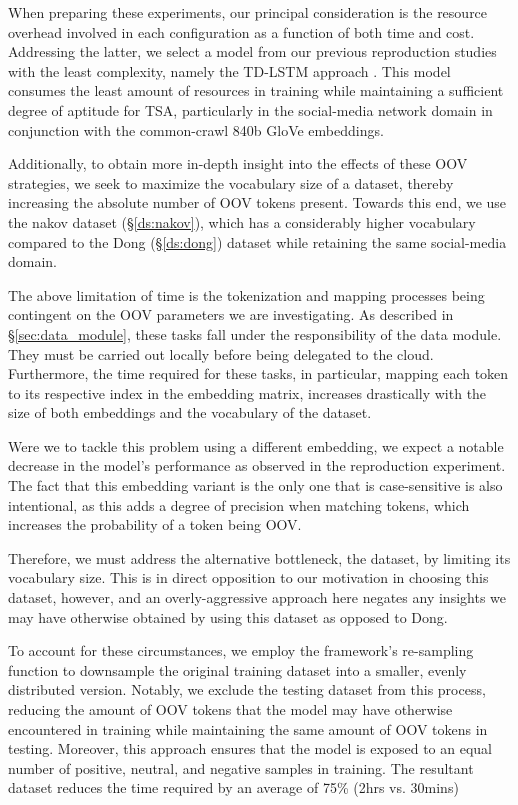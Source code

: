 \documentclass[../../fyp.tex]{subfiles}
\begin{document}
When preparing these experiments, our principal consideration is the resource overhead involved in each configuration as a function of both time and cost. Addressing the latter, we select a model from our previous reproduction studies with the least complexity, namely the TD-LSTM approach \citep{tang2016b}. This model consumes the least amount of resources in training while maintaining a sufficient degree of aptitude for TSA, particularly in the social-media network domain in conjunction with the common-crawl 840b GloVe embeddings. 

Additionally, to obtain more in-depth insight into the effects of these OOV strategies, we seek to maximize the vocabulary size of a dataset, thereby increasing the absolute number of OOV tokens present. Towards this end, we use the nakov dataset (\S\ref{ds:nakov}), which has a considerably higher vocabulary compared to the Dong (\S\ref{ds:dong}) dataset while retaining the same social-media domain.

The above limitation of time is the tokenization and mapping processes being contingent on the OOV parameters we are investigating. As described in \S\ref{sec:data_module}, these tasks fall under the responsibility of the data module. They must be carried out locally before being delegated to the cloud. Furthermore, the time required for these tasks, in particular, mapping each token to its respective index in the embedding matrix, increases drastically with the size of both embeddings and the vocabulary of the dataset.

Were we to tackle this problem using a different embedding, we expect a notable decrease in the model's performance as observed in the reproduction experiment. The fact that this embedding variant is the only one that is case-sensitive is also intentional, as this adds a degree of precision when matching tokens, which increases the probability of a token being OOV. 

Therefore, we must address the alternative bottleneck, the dataset, by limiting its vocabulary size. This is in direct opposition to our motivation in choosing this dataset, however, and an overly-aggressive approach here negates any insights we may have otherwise obtained by using this dataset as opposed to Dong.

To account for these circumstances, we employ the framework's re-sampling function to downsample the original training dataset into a smaller, evenly distributed version. Notably, we exclude the testing dataset from this process, reducing the amount of OOV tokens that the model may have otherwise encountered in training while maintaining the same amount of OOV tokens in testing. Moreover, this approach ensures that the model is exposed to an equal number of positive, neutral, and negative samples in training.
The resultant dataset reduces the time required by an average of 75\% (2hrs vs. 30mins)
\end{document}
